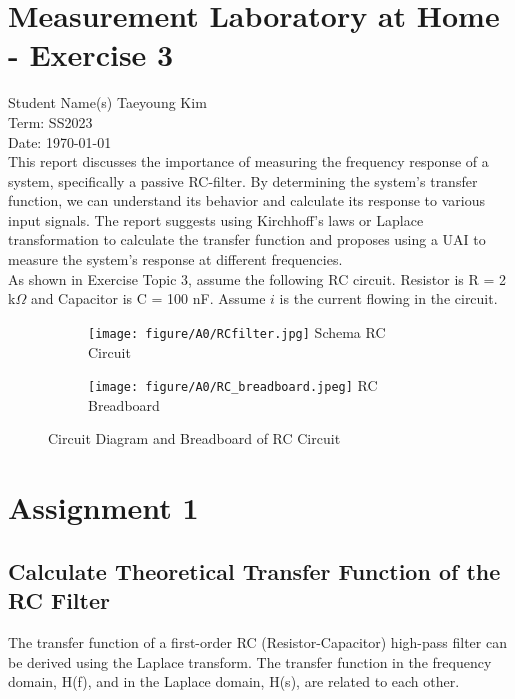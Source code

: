 \documentclass[
	a4paper,
	11pt,
]{article}
\begin{document}
\fancyhf{} %

\section*{Measurement Laboratory at Home - Exercise 3}
Student Name(s)\: Taeyoung Kim\\
Term: SS2023 \\
Date: \today \\

This report discusses the importance of measuring the frequency response of a system, specifically a passive RC-filter. By determining the system's transfer function, we can understand its behavior and calculate its response to various input signals. The report suggests using Kirchhoff's laws or Laplace transformation to calculate the transfer function and proposes using a UAI to measure the system's response at different frequencies. \\

As shown in Exercise Topic 3, assume the following RC circuit. Resistor is R = 2 k\(\Omega\) and Capacitor is C = 100 \si{\nano\farad}. Assume \(i\) is the current flowing in the circuit.

\begin{figure}[h]
    \centering
    \begin{subfigure}[b]{0.47\textwidth}
        \centering
        \texttt{[image: figure/A0/RCfilter.jpg]}
        \label{fig:RC_schema}
        {{\small  Schema RC Circuit}}  
    \end{subfigure}
    \hfill
    \begin{subfigure}[b]{0.47\textwidth}
        \centering
        \texttt{[image: figure/A0/RC\_breadboard.jpeg]}
        \label{fig:RC_breadboard}
        {{\small RC Breadboard}}   
    \end{subfigure}
    \caption{Circuit Diagram and Breadboard of RC Circuit}
    \label{fig:RC_shema_and_bread}
\end{figure}

\section{Assignment 1}
\subsection{Calculate Theoretical Transfer Function of the RC Filter}
The transfer function of a first-order RC (Resistor-Capacitor) high-pass filter can be derived using the Laplace transform. The transfer function in the frequency domain, H(f), and in the Laplace domain, H(s), are related to each other. 
\end{document}
